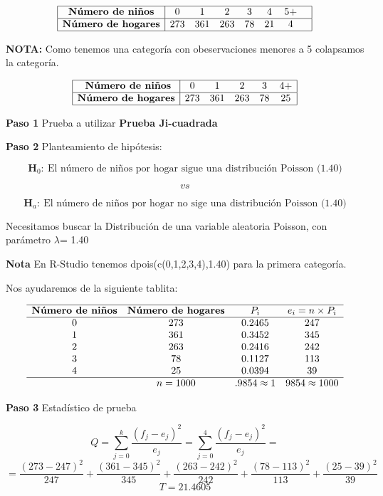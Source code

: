 \documentclass[
  a4paper,
  oneside,
  openany]{book}
\begin{document}
\[
\begin{array}{|c |c c c c c c c|}
\hline
\textbf{Número de niños} &0 &1 &2& 3&4 &5+& \\
\hline
\textbf{Número de hogares} & 273& 361&263 &78 & 21 & 4& \\
\hline
\end{array}
\]

\textbf{NOTA:} Como tenemos una categoría con obeservaciones menores a 5 colapsamos la categoría.

\[
\begin{array}{|c |c c c c c|}
\hline
\textbf{  Número de niños} &0 &1 &2& 3&4+  \\
\hline
\textbf{Número de hogares} & 273& 361&263 &78 & 25  \\
\hline
\end{array}
 \]

\textbf{Paso 1} Prueba a utilizar \textbf{Prueba Ji-cuadrada}

\textbf{Paso 2} Planteamiento de hipótesis:

\[\textbf{H}_0: \ \mbox{El número de niños por hogar sigue una distribución Poisson (1.40)}\]

\[vs\]

\[\textbf{H}_a: \ \mbox{El número de niños por hogar no sige una distribución Poisson (1.40)}\]

Necesitamos buscar la Distribución de una variable aleatoria Poisson, con parámetro \(\lambda\)= 1.40

\textbf{Nota} En R-Studio tenemos dpois(c(0,1,2,3,4),1.40) para la primera categoría.

Nos ayudaremos de la siguiente tablita:

\[
\begin{array}{c c c c c}
\hline
\textbf{Número de niños} & \textbf{Número de hogares} & P_{i} & e_i=n \times P_i \\
\hline
0&273&0.2465&247 \\
1&361&0.3452&345 \\
2&263&0.2416&242 \\
3&78&0.1127&113 \\
4&25&0.0394&39 \\
\hline
&n=1000&.9854\approx1 &9854\approx1000 \\
\end{array}
\]

\textbf{Paso 3} Estadístico de prueba

\[Q=\sum_{j=0}^{k}\frac{(f_{j}-e_{j})^2}{e_{j}}=\sum_{j=0}^{4}\frac{(f_{j}-e_{j})^2}{e_{j}}=\]
\[=\frac{(273-247)^2}{247}+\frac{(361-345)^2}{345}+\frac{(263-242)^2}{242}+\frac{(78-113)^2}{113}+\frac{(25-39)^2}{39}\]
\[T=21.4605\]
\end{document}
